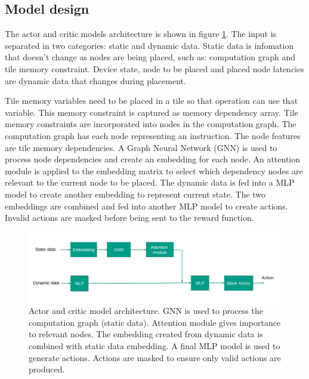 \subsection{Model design}

The actor and critic models architecture is shown in figure \ref{fig:model}. 
The input is separated in two categories: static and dynamic data. 
Static data is infomation that doesn't change as nodes are being placed, such as: computation graph and tile memory constraint.
Device state, node to be placed and placed node latencies are dynamic data that changes during placement.

Tile memory variables need to be placed in a tile so that operation can use that variable. This memory constraint is captured as 
memory dependency array. Tile memory constraints are incorporated into nodes in the computation graph. The computation graph 
has each node representing an instruction. The node features are tile memory dependencies. A Graph Neural Network (GNN) is 
used to process node dependencies and create an embedding for each node. An attention module is applied to the embedding matrix 
to select which dependency nodes are relevant to the current node to be placed. The dynamic data is fed into a MLP model to 
create another embedding to represent current state. The two embeddings are combined and fed into another MLP model to 
create actions. Invalid actions are masked before being sent to the reward function.

\begin{figure}[h]
  \centering
  \includegraphics[width=\linewidth]{fig/model.pdf}
  \caption{Actor and critic model architecture. GNN is used to process the computation graph (static data). 
  Attention module gives importance to relevant nodes. The embedding created from dynamic data is combined with static data embedding. 
  A final MLP model is used to generate actions. Actions are masked to ensure only valid actions are produced. }
  \label{fig:model}
\end{figure}

